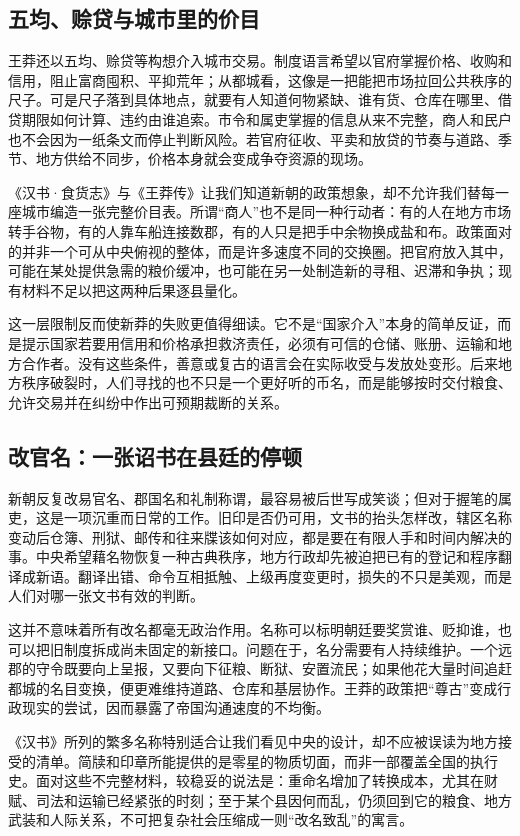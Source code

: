 \subsection{五均、赊贷与城市里的价目}

王莽还以五均、赊贷等构想介入城市交易。制度语言希望以官府掌握价格、收购和信用，阻止富商囤积、平抑荒年；从都城看，这像是一把能把市场拉回公共秩序的尺子。可是尺子落到具体地点，就要有人知道何物紧缺、谁有货、仓库在哪里、借贷期限如何计算、违约由谁追索。市令和属吏掌握的信息从来不完整，商人和民户也不会因为一纸条文而停止判断风险。若官府征收、平卖和放贷的节奏与道路、季节、地方供给不同步，价格本身就会变成争夺资源的现场。

《汉书·食货志》与《王莽传》让我们知道新朝的政策想象，却不允许我们替每一座城市编造一张完整价目表。所谓“商人”也不是同一种行动者：有的人在地方市场转手谷物，有的人靠车船连接数郡，有的人只是把手中余物换成盐和布。政策面对的并非一个可从中央俯视的整体，而是许多速度不同的交换圈。把官府放入其中，可能在某处提供急需的粮价缓冲，也可能在另一处制造新的寻租、迟滞和争执；现有材料不足以把这两种后果逐县量化。

这一层限制反而使新莽的失败更值得细读。它不是“国家介入”本身的简单反证，而是提示国家若要用信用和价格承担救济责任，必须有可信的仓储、账册、运输和地方合作者。没有这些条件，善意或复古的语言会在实际收受与发放处变形。后来地方秩序破裂时，人们寻找的也不只是一个更好听的币名，而是能够按时交付粮食、允许交易并在纠纷中作出可预期裁断的关系。

\subsection{改官名：一张诏书在县廷的停顿}

新朝反复改易官名、郡国名和礼制称谓，最容易被后世写成笑谈；但对于握笔的属吏，这是一项沉重而日常的工作。旧印是否仍可用，文书的抬头怎样改，辖区名称变动后仓簿、刑狱、邮传和往来牒该如何对应，都是要在有限人手和时间内解决的事。中央希望藉名物恢复一种古典秩序，地方行政却先被迫把已有的登记和程序翻译成新语。翻译出错、命令互相抵触、上级再度变更时，损失的不只是美观，而是人们对哪一张文书有效的判断。

这并不意味着所有改名都毫无政治作用。名称可以标明朝廷要奖赏谁、贬抑谁，也可以把旧制度拆成尚未固定的新接口。问题在于，名分需要有人持续维护。一个远郡的守令既要向上呈报，又要向下征粮、断狱、安置流民；如果他花大量时间追赶都城的名目变换，便更难维持道路、仓库和基层协作。王莽的政策把“尊古”变成行政现实的尝试，因而暴露了帝国沟通速度的不均衡。

《汉书》所列的繁多名称特别适合让我们看见中央的设计，却不应被误读为地方接受的清单。简牍和印章所能提供的是零星的物质切面，而非一部覆盖全国的执行史。面对这些不完整材料，较稳妥的说法是：重命名增加了转换成本，尤其在财赋、司法和运输已经紧张的时刻；至于某个县因何而乱，仍须回到它的粮食、地方武装和人际关系，不可把复杂社会压缩成一则“改名致乱”的寓言。

